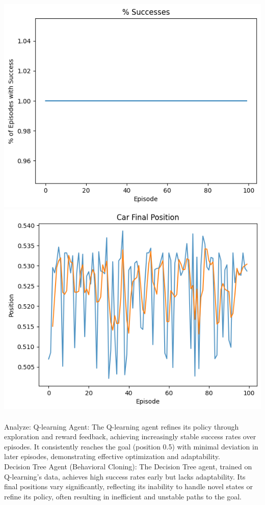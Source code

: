 \documentclass[12pt]{article}
\begin{document}
\begin{enumerate}
\begin{enumerate}
    \begin{center}
    \includegraphics[scale = 0.5]{images/2.10.1.png}
    \includegraphics[scale = 0.5]{images/2.10.2.png}
    \end{center}
    \paragraph{}
    Analyze:
    Q-learning Agent: The Q-learning agent refines its policy through exploration and reward feedback, achieving increasingly stable success rates over episodes. It consistently reaches the goal (position 0.5) with minimal deviation in later episodes, demonstrating effective optimization and adaptability.\\

    Decision Tree Agent (Behavioral Cloning): The Decision Tree agent, trained on Q-learning’s data, achieves high success rates early but lacks adaptability. Its final positions vary significantly, reflecting its inability to handle novel states or refine its policy, often resulting in inefficient and unstable paths to the goal.
\end{enumerate}
\end{enumerate}
\end{document}
